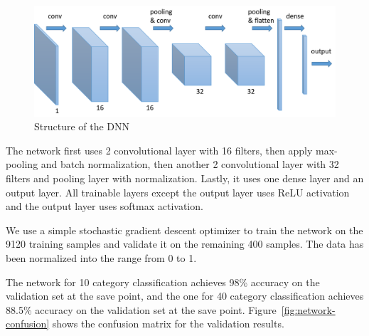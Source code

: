 \documentclass[journal]{IEEEtran}
\begin{document}
\begin{figure}[h]
	\centering
	\includegraphics[width=\linewidth]{fig/network.png}
	\caption{Structure of the DNN}
	\label{fig:network}
\end{figure}

The network first uses 2 convolutional layer with 16 filters, then apply max-pooling and batch normalization, then another 2 convolutional layer with 32 filters and pooling layer with normalization. Lastly, it uses one dense layer and an output layer. All trainable layers except the output layer uses ReLU activation and the output layer uses softmax activation.

We use a simple stochastic gradient descent optimizer to train the network on the 9120 training samples and validate it on the remaining 400 samples.
The data has been normalized into the range from 0 to 1.

The network for 10 category classification achieves 98\% accuracy on the validation set at the save point, and the one for 40 category classification achieves 88.5\% accuracy on the validation set at the save point.
Figure~\ref{fig:network-confusion} shows the confusion matrix for the validation results.
\end{document}
